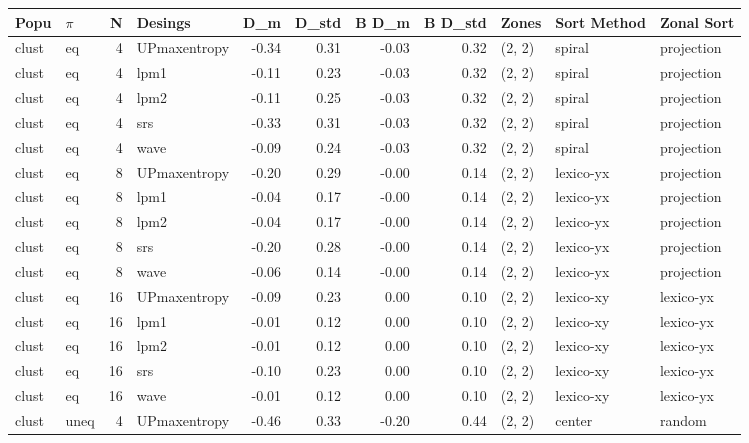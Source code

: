 \begin{tabular}{llrlrrrrlll}
\toprule
  Popu & $\pi$ &  N &      Desings &   D_m &  D_{std} &  B D_m &  B D_{std} &  Zones & Sort Method & Zonal Sort \\
\midrule
 clust &    eq &  4 & UPmaxentropy & -0.34 &     0.31 &  -0.03 &       0.32 & (2, 2) &      spiral & projection \\
 clust &    eq &  4 &         lpm1 & -0.11 &     0.23 &  -0.03 &       0.32 & (2, 2) &      spiral & projection \\
 clust &    eq &  4 &         lpm2 & -0.11 &     0.25 &  -0.03 &       0.32 & (2, 2) &      spiral & projection \\
 clust &    eq &  4 &          srs & -0.33 &     0.31 &  -0.03 &       0.32 & (2, 2) &      spiral & projection \\
 clust &    eq &  4 &         wave & -0.09 &     0.24 &  -0.03 &       0.32 & (2, 2) &      spiral & projection \\
 clust &    eq &  8 & UPmaxentropy & -0.20 &     0.29 &  -0.00 &       0.14 & (2, 2) &   lexico-yx & projection \\
 clust &    eq &  8 &         lpm1 & -0.04 &     0.17 &  -0.00 &       0.14 & (2, 2) &   lexico-yx & projection \\
 clust &    eq &  8 &         lpm2 & -0.04 &     0.17 &  -0.00 &       0.14 & (2, 2) &   lexico-yx & projection \\
 clust &    eq &  8 &          srs & -0.20 &     0.28 &  -0.00 &       0.14 & (2, 2) &   lexico-yx & projection \\
 clust &    eq &  8 &         wave & -0.06 &     0.14 &  -0.00 &       0.14 & (2, 2) &   lexico-yx & projection \\
 clust &    eq & 16 & UPmaxentropy & -0.09 &     0.23 &   0.00 &       0.10 & (2, 2) &   lexico-xy &  lexico-yx \\
 clust &    eq & 16 &         lpm1 & -0.01 &     0.12 &   0.00 &       0.10 & (2, 2) &   lexico-xy &  lexico-yx \\
 clust &    eq & 16 &         lpm2 & -0.01 &     0.12 &   0.00 &       0.10 & (2, 2) &   lexico-xy &  lexico-yx \\
 clust &    eq & 16 &          srs & -0.10 &     0.23 &   0.00 &       0.10 & (2, 2) &   lexico-xy &  lexico-yx \\
 clust &    eq & 16 &         wave & -0.01 &     0.12 &   0.00 &       0.10 & (2, 2) &   lexico-xy &  lexico-yx \\
 clust &  uneq &  4 & UPmaxentropy & -0.46 &     0.33 &  -0.20 &       0.44 & (2, 2) &      center &     random \\

\end{tabular}
